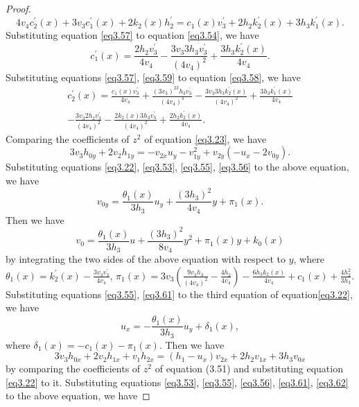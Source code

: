 \documentclass[12pt, twoside, leqno]{article}
\theoremstyle{definition}
\numberwithin{equation}{section}
\begin{document}
\begin{proof}
\begin{equation}
4v_{4}c_{2}^{'}(x)+3v_3c_{1}^{'}(x)+2k_{2}(x)h_{2}^{'}=c_{1}(x)v_{3}^{'}+2h_{2}k_{2}^{'}(x)+3h_{3}k_{1}^{'}(x).
\end{equation}
Substituting equation \eqref{eq3.57} to equation \eqref{eq3.54}, we have
\begin{equation}\label{eq3.59}
c_{1}^{'}(x)=\frac{2h_{2}v_{3}^{'}}{4v_{4}}-\frac{3v_{3}3h_{3}v_{3}^{'}}{(4v_{4})^{2}}+\frac{3h_{3}k_{2}^{'}(x)}{4v_{4}}.
\end{equation}
Substituting equations \eqref{eq3.57}, \eqref{eq3.59} to equation \eqref{eq3.58}, we have
\begin{equation}\label{eq3.60}
\begin{split}
c_{2}^{'}(x)=\frac{c_{1}(x)v_{3}^{'}}{4v_{4}}+\frac{(3v_{3})^23h_{3}v_{3}^{'}}{(4v_{4})^{3}}-\frac{3v_{3}3h_{3}k_{2}^{'}(x)}{(4v_{4})^{2}}+\frac{3h_{3}k_{1}^{'}(x)}{4v_{4}}\\
-\frac{3v_{3}2h_{2}v_{3}^{'}}{(4v_{4})^{2}}-\frac{2k_{2}(x)3h_{3}v_{3}^{'}}{(4v_{4})^{2}}+\frac{2h_{2}k_{2}^{'}(x)}{4v_{4}}.
\end{split}
\end{equation}
Comparing the coefficients of $z^2$ of equation \eqref{eq3.23}, we have
$$3v_3h_{0y}+2v_2h_{1y}=-v_{2x}u_y-v_{1y}^2+v_{2y}(-u_x-2v_{0y}).$$
Substituting equations \eqref{eq3.22}, \eqref{eq3.53}, \eqref{eq3.55}, \eqref{eq3.56} to the above equation, we have
$$v_{0y}=\frac{\theta_1(x)}{3h_3}u_y+\frac{(3h_3)^2}{4v_4}y+\pi_1(x).$$
Then we have
\begin{equation}\label{eq3.61}
v_{0}=\frac{\theta_1(x)}{3h_3}u+\frac{(3h_3)^2}{8v_4}y^2+\pi_1(x)y+k_0(x)
\end{equation}
by integrating the two sides of the above equation with respect to $y$,
where $\theta_1(x)=k_2^{'}(x)-\frac{3v_3v_3^{'}}{4v_4}$, $\pi_1(x)=3v_3\left( \frac{9v_3h_{3}}{(4v_{4})^{2}}-\frac{4h_{2}}{4v_{4}}\right)-\frac{6h_{3}k_{2}(x)}{4v_{4}}+c_{1}(x)+\frac{4h_2^2}{3h_{3}}$.
Substituting equations \eqref{eq3.55}, \eqref{eq3.61} to the third equation of equation\eqref{eq3.22}, we have
\begin{equation}\label{eq3.62}
u_x=-\frac{\theta_{1}(x)}{3h_{3}}u_{y}+\delta_{1}(x),
\end{equation}
where $\delta_1(x)=-c_1(x)-\pi_1(x)$. Then we have
$$3v_3h_{0x}+2v_2h_{1x}+v_1h_{2x}=(h_1-u_x)v_{2x}+2h_2v_{1x}+3h_3v_{0x}$$
by comparing the coefficients of $z^2$ of equation (3.51) and substituting equation \eqref{eq3.22} to it. Substituting equations \eqref{eq3.53}, \eqref{eq3.55}, \eqref{eq3.56}, \eqref{eq3.61}, \eqref{eq3.62} to the above equation, we have

\end{proof}
\end{document}
